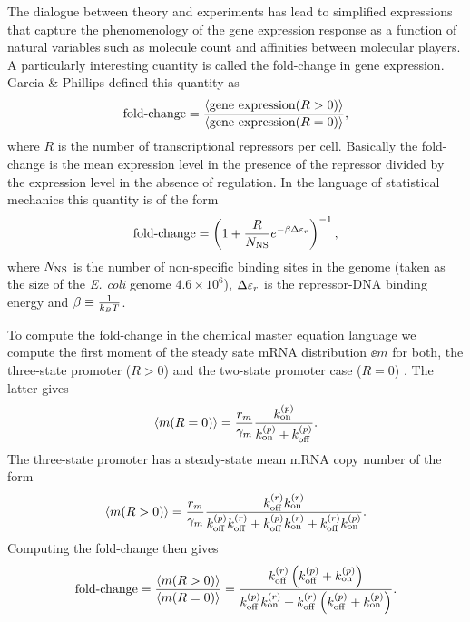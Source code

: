 The dialogue between theory and experiments has lead to simplified expressions
that capture the phenomenology of the gene expression response as a function of
natural variables such as molecule count and affinities between molecular
players. A particularly interesting cuantity is called the fold-change in gene
expression. Garcia \& Phillips \cite{Garcia2011c} defined this quantity as
\begin{equation}
  \text{fold-change} = {\left\langle \text{gene expression}(R > 0) \right\rangle \over
                 \left\langle \text{gene expression}(R = 0) \right\rangle},
\end{equation}
where $R$ is the number of transcriptional repressors per cell. Basically the
fold-change is the mean expression level in the presence of the repressor
divided by the expression level in the absence of regulation. In the language of
statistical mechanics this quantity is of the form \cite{Garcia2011c}
\begin{equation}
  \text{fold-change} = \left( 1 + {R \over N_\text{NS}} e^{-\beta\Delta\varepsilon_r} \right)^{-1},
  \label{eq_fc_thermo}
\end{equation}
where $N_\text{NS}$ is the number of non-specific binding sites in the genome (taken
as the size of the \textit{E. coli} genome $4.6\times 10^6$), $\Delta\varepsilon_r$ is the
repressor-DNA binding energy and $\beta \equiv {1 \over k_BT}$.

To compute the fold-change in the chemical master equation language we compute
the first moment of the steady sate mRNA distribution $\ee{m}$ for both, the
three-state promoter ($R>0$) and the two-state promoter case ($R=0$)
. The latter gives
\begin{equation}
  \left\langle m (R = 0) \right\rangle = {r_m \over \gamma _m} {k^{(p)}_{\text{on}} \over k^{(p)}_{\text{on}} + k^{(p)}_{\text{off}}}.
\end{equation}
The three-state promoter has a steady-state mean mRNA copy number of the form
\begin{equation}
  \left\langle m (R > 0) \right\rangle = {r_m \over \gamma _m} {k^{(r)}_{\text{off}}k^{(r)}_{\text{on}}
  \over k^{(p)}_{\text{off}}k^{(r)}_{\text{off}} + k^{(p)}_{\text{off}}k^{(r)}_{\text{on}} + k^{(r)}_{\text{off}}k^{(p)}_{\text{on}}}.
\end{equation}
Computing the fold-change then gives
\begin{equation}
  \text{fold-change} = {\left\langle m (R > 0) \right\rangle \over \left\langle m (R = 0) \right\rangle} =
  {k^{(r)}_{\text{off}} \left( k^{(p)}_{\text{off}} + k^{(p)}_{\text{on}} \right) \over
  k^{(p)}_{\text{off}}k^{(r)}_{\text{on}} + k^{(r)}_{\text{off}} \left( k^{(p)}_{\text{off}} + k^{(p)}_{\text{on}} \right)}.
  \label{eq_fold_change_cme}
\end{equation}

